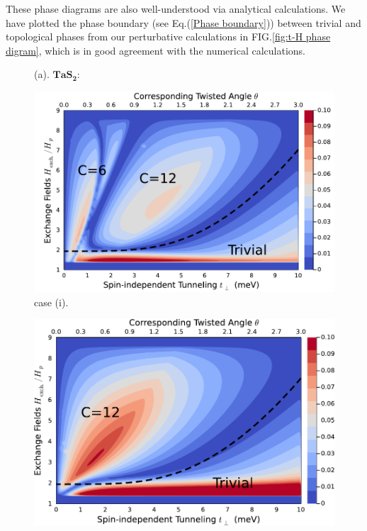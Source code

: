 These phase diagrams are also well-understood via analytical calculations. We have plotted the phase boundary (see Eq.(\ref{Phase boundary})) between trivial and topological phases from our perturbative calculations in FIG.\ref{fig:t-H phase digram}, which is in good agreement with the numerical calculations.
\begin{figure}[!htp]
	\centering
	\begin{minipage}{1.0\textwidth}
		\RaggedRight (a). $\mathbf{TaS_2:}$\\[0.5em]
		\begin{minipage}{0.45\textwidth}
			\centering
			\includegraphics[width=\linewidth]{contents/Ising_Top/figures/pdf_files/Gap_Size_Phase_Diagram.TaS2.t_H.magnetic_with_prediction.pdf}\\
			case (i).
		\end{minipage}
		\hspace{1em}
		\begin{minipage}{0.45\textwidth}
			\centering
			\includegraphics[width=\linewidth]{contents/Ising_Top/figures/pdf_files/Gap_Size_Phase_Diagram.TaS2.t_H.non-magnetic_with_prediction.pdf}\\

\end{minipage}
\end{minipage}
\end{figure}
